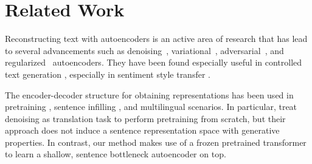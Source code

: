 \section{Related Work}
Reconstructing text with autoencoders is an active area of research that has lead to several advancements
such as denoising~\cite{vincent2010stacked}, variational~\cite{kingma2013autoencoding, Higgins2017betaVAELB, dai2019diagnosing}, adversarial~\cite{makhzani2015adversarial, zhao2018adversarially}, and regularized~\cite{Ghosh2020From} autoencoders. They have been found especially useful in controlled text generation \citep{hu2017toward, logeswaran2018content, bowman2016generating}, especially in sentiment style transfer \citep{mai2020plug, shen2017style}.

The encoder-decoder structure for obtaining representations has been used in pretraining \citep{lewis2019bart}, sentence infilling \citep{huang2020inset}, and multilingual \citep{artetxe18} scenarios. In particular, \citet{lewis2019bart} treat denoising as translation task to perform pretraining from scratch, but their approach does not induce a sentence representation space with generative properties.
In contrast, our method makes use of a frozen pretrained transformer to learn a shallow, sentence bottleneck autoencoder on top.







